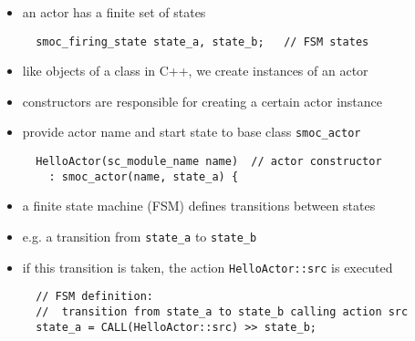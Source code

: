 \begin{frame}[fragile=singleslide]
\begin{itemize}
\item an actor has a finite set of states
\begin{lstlisting}
  smoc_firing_state state_a, state_b;   // FSM states
\end{lstlisting}
\item like objects of a class in C++, we create instances of an actor
\item constructors are responsible for creating a certain actor instance
\item provide actor name and start state to base class \lstinline!smoc_actor!
\begin{lstlisting}
  HelloActor(sc_module_name name)  // actor constructor
    : smoc_actor(name, state_a) {
\end{lstlisting}
\item a finite state machine (FSM) defines transitions between states
\item e.g. a transition from \lstinline!state_a! to \lstinline!state_b!
\item if this transition is taken, the action \lstinline!HelloActor::src! is executed
\begin{lstlisting}
  // FSM definition:
  //  transition from state_a to state_b calling action src
  state_a = CALL(HelloActor::src) >> state_b;
\end{lstlisting}
\end{itemize}
\end{frame}

